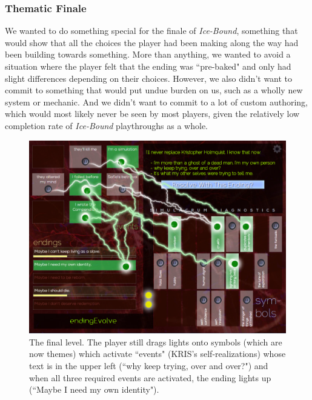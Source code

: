 \subsubsection{Thematic Finale}\label{subsubsec:thematic-finale}

We wanted to do something special for the finale of \textit{Ice-Bound}, something that would show that all the choices the player had been making along the way had been building towards something. More than anything, we wanted to avoid a situation where the player felt that the ending was ``pre-baked" and only had slight differences depending on their choices. However, we also didn't want to commit to something that would put undue burden on us, such as a wholly new system or mechanic. And we didn't want to commit to a lot of custom authoring, which would most likely never be seen by most players, given the relatively low completion rate of \textit{Ice-Bound} playthroughs as a whole.


\begin{figure}
    \centering
    \includegraphics[width=\textwidth]{figures/2-Ice-Bound/finale.png}
    \caption{The final level. The player still drags lights onto symbols (which are now themes) which activate ``events" (KRIS's self-realizations) whose text is in the upper left (``why keep trying, over and over?") and when all three required events are activated, the ending lights up (``Maybe I need my own identity").}
    \label{fig:finale}
\end{figure}

